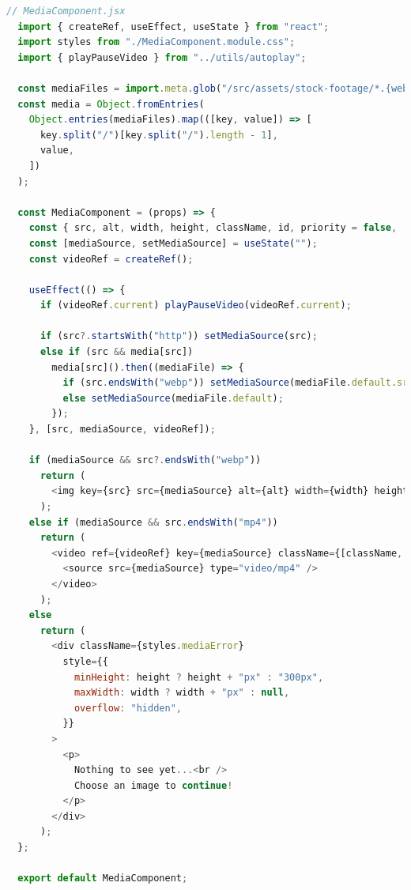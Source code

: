 \documentclass[a4paper, 12pt]{article}
\begin{document}
\begin{lstlisting}[caption=MediaComponent Astro Island with React, label={lst:AstroIsland:MediaComponent}, language=JavaScript]
  // MediaComponent.jsx
  import { createRef, useEffect, useState } from "react";
  import styles from "./MediaComponent.module.css";
  import { playPauseVideo } from "../utils/autoplay";
  
  const mediaFiles = import.meta.glob("/src/assets/stock-footage/*.{webp,mp4}");
  const media = Object.fromEntries(
    Object.entries(mediaFiles).map(([key, value]) => [
      key.split("/")[key.split("/").length - 1],
      value,
    ])
  );
  
  const MediaComponent = (props) => {
    const { src, alt, width, height, className, id, priority = false, ...rest } = props;
    const [mediaSource, setMediaSource] = useState("");
    const videoRef = createRef();
  
    useEffect(() => {
      if (videoRef.current) playPauseVideo(videoRef.current);
  
      if (src?.startsWith("http")) setMediaSource(src);
      else if (src && media[src])
        media[src]().then((mediaFile) => {
          if (src.endsWith("webp")) setMediaSource(mediaFile.default.src);
          else setMediaSource(mediaFile.default);
        });
    }, [src, mediaSource, videoRef]);
  
    if (mediaSource && src?.endsWith("webp"))
      return (
        <img key={src} src={mediaSource} alt={alt} width={width} height={height} className={[className, styles.postMedia].join(" ")} id={id} loading={priority ? "eager" : "lazy"} {...rest} />
      );
    else if (mediaSource && src.endsWith("mp4"))
      return (
        <video ref={videoRef} key={mediaSource} className={[className, styles.postMedia].join(" ")} id={id} width={width} preload="metadata" controls controlsList="nodownload,nofullscreen,noremoteplayback" disablePictureInPicture loop muted >
          <source src={mediaSource} type="video/mp4" />
        </video>
      );
    else
      return (
        <div className={styles.mediaError}
          style={{
            minHeight: height ? height + "px" : "300px",
            maxWidth: width ? width + "px" : null,
            overflow: "hidden",
          }}
        >
          <p>
            Nothing to see yet...<br />
            Choose an image to continue!
          </p>
        </div>
      );
  };
  
  export default MediaComponent;
\end{lstlisting}
\end{document}
